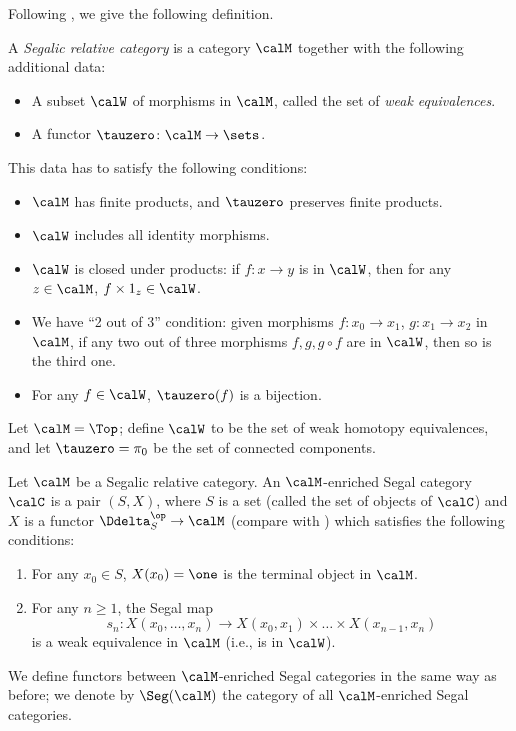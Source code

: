 Following , we give the following definition.

\begin{definition}
  A \emph{Segalic relative category} is a category $\calM$ together with the
  following additional data:
  \begin{itemize}
    \item A subset $\calW$ of morphisms in $\calM$, called the set of
      \emph{weak equivalences}.
    \item A functor $\tauzero\colon \calM\to \sets$.
  \end{itemize}
  This data has to satisfy the following conditions:
  \begin{itemize}
    \item $\calM$ has finite products, and $\tauzero$ preserves finite
      products.
    \item $\calW$ includes all identity morphisms.
    \item $\calW$ is closed under products: if $f\colon x\to y$ is in $\calW$,
      then for any $z\in \calM$, $f\times 1_z\in \calW$.
    \item We have ``2 out of 3'' condition: given morphisms $f\colon x_0\to
      x_1$, $g\colon x_1\to x_2$ in $\calM$, if any two out of three morphisms
      $f, g, g\circ f$ are in $\calW$, then so is the third one.
    \item For any $f\in \calW$, $\tauzero(f)$ is a bijection.
  \end{itemize}
\end{definition}

\begin{example}\label{x:top-weak-equiv}
  Let $\calM=\Top$; define $\calW$ to be the set of weak homotopy equivalences,
  and let $\tauzero=\pi_0$ be the set of connected components.
\end{example}



\begin{definition}\label{d:segal-enriched}
  Let $\calM$ be a Segalic relative category. An $\calM$-enriched Segal category
  $\calC$ is a pair $(S,X)$, where $S$ is a set (called the set of objects of
  $\calC$) and $X$ is a functor $\Ddelta_S^\op\to \calM$ (compare with
  ) which satisfies the following conditions:
    \begin{enumerate}
      \item For any $x_0\in S$, $X(x_0)=\one$ is the terminal object in $\calM$.
      \item For any $n\ge 1$, the Segal map
      $$
         s_n\colon X(x_0, \dots, x_n)\to
                X(x_0, x_1)\times \dots\times X(x_{n-1}, x_n)
      $$
      is a weak equivalence in $\calM$ (i.e., is in $\calW$).
    \end{enumerate}

    We define functors between $\calM$-enriched Segal categories in the same way
    as before; we denote by $\Seg(\calM)$ the category of all $\calM$-enriched
    Segal categories.
\end{definition}

